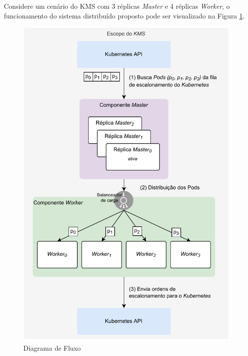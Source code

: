 Considere um cenário do \ac{KMS} com 3 réplicas \textit{Master} e 4 réplicas \textit{Worker}, o funcionamento do sistema distribuído proposto pode ser visualizado na Figura \ref{fig:relacao-master-worker}.




\newpage
\begin{figure}[h!]
	\caption{\label{fig:relacao-master-worker}Diagrama de Fluxo}
	\centering
	\includegraphics[width=.60\linewidth]{assets/relacao-master-worker.pdf}
\end{figure}

